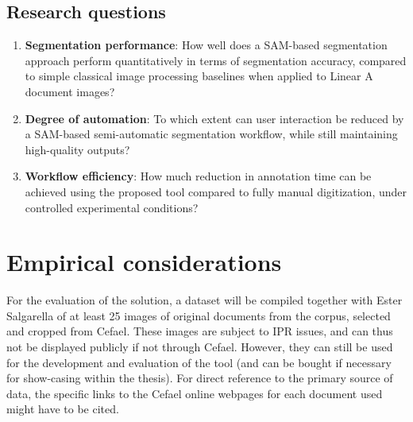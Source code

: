 \subsection{Research questions}
\begin{enumerate}
\item \textbf{Segmentation performance}: 
How well does a \acs{SAM}-based segmentation approach perform quantitatively in terms of segmentation accuracy, compared to simple classical image processing baselines when applied to Linear A document images?
\item \textbf{Degree of automation}: 
To which extent can user interaction be reduced by a \acs{SAM}-based semi-automatic segmentation workflow, while still maintaining high-quality outputs?
\item \textbf{Workflow efficiency}: 
How much reduction in annotation time can be achieved using the proposed tool compared to fully manual digitization, under controlled experimental conditions?
\end{enumerate}

\section{Empirical considerations}
For the evaluation of the solution, a dataset will be compiled together with Ester Salgarella of at least 25 images of original 
documents from the corpus, selected and cropped from \acs{Cefael}.
These images are subject to \acf{IPR} issues, and can thus not be displayed publicly if not through \acs{Cefael}.
However, they can still be used for the development and evaluation of the tool (and can be bought if necessary for show-casing within the thesis).
For direct reference to the primary source of data, the specific links to the \acs{Cefael} online webpages for each document used might have to be cited.

